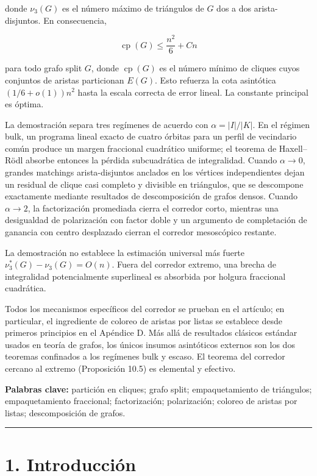 \documentclass[
  11pt,
]{article}
\begin{document}
donde \(\nu_3(G)\) es el número máximo de triángulos de \(G\) dos a dos
arista-disjuntos. En consecuencia,

\[
\operatorname{cp}(G)
\le
\frac{n^2}{6}+Cn
\]

para todo grafo split \(G\), donde \(\operatorname{cp}(G)\) es el número
mínimo de cliques cuyos conjuntos de aristas particionan \(E(G)\). Esto
refuerza la cota asintótica \((1/6+o(1))n^2\) hasta la escala correcta
de error lineal. La constante principal es óptima.

La demostración separa tres regímenes de acuerdo con \(\alpha=|I|/|K|\).
En el régimen bulk, un programa lineal exacto de cuatro órbitas para un
perfil de vecindario común produce un margen fraccional cuadrático
uniforme; el teorema de Haxell--Rödl absorbe entonces la pérdida
subcuadrática de integralidad. Cuando \(\alpha\to0\), grandes matchings
arista-disjuntos anclados en los vértices independientes dejan un
residual de clique casi completo y divisible en triángulos, que se
descompone exactamente mediante resultados de descomposición de grafos
densos. Cuando \(\alpha\to2\), la factorización promediada cierra el
corredor corto, mientras una desigualdad de polarización con factor
doble y un argumento de completación de ganancia con centro desplazado
cierran el corredor mesoscópico restante.

La demostración no establece la estimación universal más fuerte
\(\nu_3^*(G)-\nu_3(G)=O(n)\). Fuera del corredor extremo, una brecha de
integralidad potencialmente superlineal es absorbida por holgura
fraccional cuadrática.

Todos los mecanismos específicos del corredor se prueban en el artículo;
en particular, el ingrediente de coloreo de aristas por listas se
establece desde primeros principios en el Apéndice D. Más allá de
resultados clásicos estándar usados en teoría de grafos, los únicos
insumos asintóticos externos son los dos teoremas confinados a los
regímenes bulk y escaso. El teorema del corredor cercano al extremo
(Proposición 10.5) es elemental y efectivo.

\textbf{Palabras clave:} partición en cliques; grafo split;
empaquetamiento de triángulos; empaquetamiento fraccional;
factorización; polarización; coloreo de aristas por listas;
descomposición de grafos.

\begin{center}\rule{0.5\linewidth}{0.5pt}\end{center}

\section{1. Introducción}\label{introducciuxf3n}
\end{document}

